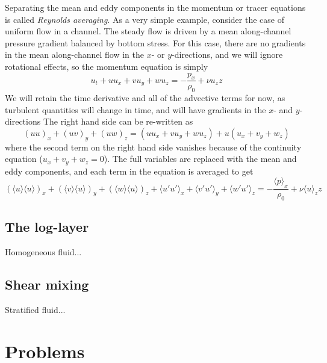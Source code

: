 \documentclass[11pt]{report}
\numberwithin{equation}{section}
\begin{document}
Separating the mean and eddy components in the momentum or tracer equations is called \emph{Reynolds averaging}.  As a very simple example, consider the case of uniform flow in a channel.  The steady flow is driven by a mean along-channel pressure gradient balanced by bottom stress.  For this case, there are no gradients in the mean along-channel flow in the $x$- or $y$-directions, and we will ignore rotational effects, so the momentum equation is simply
\begin{equation}
    u_t + u u_x + v u_y + w u_z = -\frac{p_x}{\rho_0} + \nu u_zz
\end{equation}
We will retain the time derivative and all of the advective terms for now, as turbulent quantities will change in time, and will have gradients in the $x$- and $y$-directions The right hand side can be re-written as
\begin{equation}
    (u u)_x + (u v)_y + (u w)_z = (u u_x + v u_y + w u_z) + u (u_x + v_y + w_z)
\end{equation}
where the second term on the right hand side vanishes because of the continuity equation ($u_x + v_y + w_z=0$).  The full variables are replaced with the mean and eddy components, and each term in the equation is averaged to get
\begin{equation}
    (\langle u \rangle \langle u \rangle)_x + (\langle v \rangle \langle u \rangle)_y + (\langle w \rangle \langle u \rangle)_z +  \langle u' u' \rangle_x + \langle v' u' \rangle_y + \langle w' u' \rangle_z= -\frac{\langle p \rangle_x}{\rho_0} + \nu \langle u \rangle_zz
\end{equation}

\section{The log-layer}


Homogeneous fluid...

\section{Shear mixing}

Stratified fluid...





\chapter{Problems}
\end{document}
